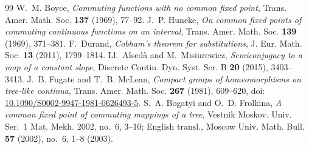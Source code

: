 \documentclass[11pt]{article}
\begin{document}
\begin{thebibliography}{99}
 W.~M. Boyce, \emph{Commuting functions with no common fixed point},
Trans. Amer. Math. Soc. \textbf{137} (1969), 77--92.
 J.~P. Huneke, \emph{On common fixed points of commuting continuous functions on an interval},
Trans. Amer. Math. Soc. \textbf{139} (1969), 371--381.
 F.~Durand, \emph{Cobham's theorem for substitutions},
J. Eur. Math. Soc. \textbf{13} (2011), 1799--1814.
 Ll.~Alsed\`a and M.~Misiurewicz,
\emph{Semiconjugacy to a map of a constant slope}, Discrete Contin. Dyn. Syst. Ser. B \textbf{20}
(2015), 3403--3413.
 J.~B. Fugate and T.~B. McLean,
\emph{Compact groups of homeomorphisms on tree-like continua},
Trans. Amer. Math. Soc. \textbf{267} (1981), 609--620,
doi: \href{https://doi.org/10.1090/S0002-9947-1981-0626493-5}
{10.1090/S0002-9947-1981-0626493-5}.
 S.~A. Bogatyi and O.~D. Frolkina,
\emph{A common fixed point of commuting mappings of a tree}, Vestnik Moskov. Univ. Ser.~1 Mat. Mekh.
2002, no.~6, 3--10; English transl., Moscow Univ. Math. Bull. \textbf{57} (2002), no.~6, 1--8 (2003).
\end{thebibliography}
\end{document}
